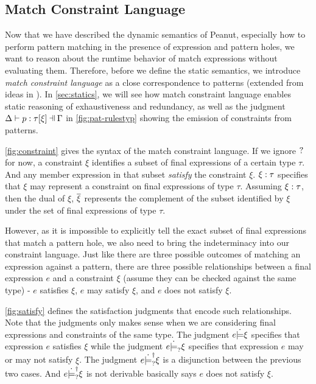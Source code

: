 \subsection{Match Constraint Language}\label{sec:constraint}
Now that we have described the dynamic semantics of Peanut,
especially how to perform pattern matching in the presence of expression and pattern holes,
we want to reason about the runtime behavior of match expressions without evaluating them.
Therefore, before we define the static semantics, we introduce \textit{match constraint language}
as a close correspondence to patterns (extended from ideas in \cite{Harper2012}).
In \autoref{sec:statics}, we will see how match constraint language enables static reasoning of exhaustiveness and redundancy, as well as the judgment $\chpattyp{p}{\tau}{\xi}{\Gamma}{\Delta}$ in \autoref{fig:pat-rulestyp} showing the emission of constraints from patterns.



\autoref{fig:constraint} gives the syntax of the match constraint language. 
If we ignore $\mathtt{?}$ for now, a constraint $\xi$ identifies a subset of final expressions of a certain type $\tau$.
And any member expression in that subset \textit{satisfy} the constraint $\xi$.
$\xi : \tau$ specifies that $\xi$ may represent a constraint on final expressions of type $\tau$.
Assuming $\xi : \tau$, then the dual of $\xi$, $\overline{\xi}$ represents the complement of the subset identified by $\xi$ under the set of final expressions of type $\tau$.

However, as it is impossible to explicitly tell the exact subset of final expressions that match a pattern hole, we also need to bring the indeterminacy into our constraint language. 
Just like there are three possible outcomes of matching an expression against a pattern, there are three possible relationships between a final expression $e$ and a constraint $\xi$ (assume they can be checked against the same type) - $e$ satisfies $\xi$, $e$ may satisfy $\xi$, and $e$ does not satisfy $\xi$. 

\autoref{fig:satisfy} defines the satisfaction judgments that encode such relationships.
Note that the judgments only makes sense when we are considering 
final expressions and constraints of the same type. 
The
judgment $e \dot{\models} \xi$ specifies that expression $e$ satisfies $\xi$ while
the judgment $e \dot{\models}_{?} \xi$ specifies that expression $e$ may or may not
satisfy $\xi$. The judgment $e \dot{\models}_{?}^{\dag} \xi$ is a disjunction between the
previous two cases. 
And $e \dot{\models}_{?}^{\dag} \xi$ is not derivable basically says $e$ does not satisfy $\xi$.

